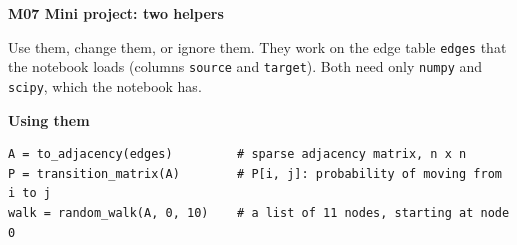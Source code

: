 \documentclass[a4paper, 12pt]{extarticle}
\begin{document}
{\Large\bfseries M07 Mini project: two helpers}

Use them, change them, or ignore them. They work on the edge table \texttt{edges}
that the notebook loads (columns \texttt{source} and \texttt{target}). Both need only
\texttt{numpy} and \texttt{scipy}, which the notebook has.



\textbf{Using them}
\begin{lstlisting}
A = to_adjacency(edges)         # sparse adjacency matrix, n x n
P = transition_matrix(A)        # P[i, j]: probability of moving from i to j
walk = random_walk(A, 0, 10)    # a list of 11 nodes, starting at node 0
\end{lstlisting}
\end{document}
